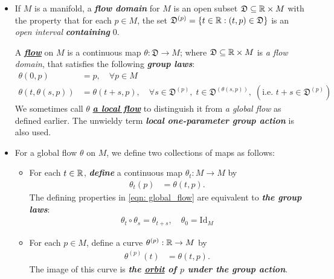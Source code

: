 \documentclass[11pt]{article}
\begin{document}
\begin{itemize}
\item \begin{definition}
If $M$ is a manifold, a \emph{\textbf{flow domain}} for $M$ is an open subset $\mathfrak{D} \subseteq {\mathbb R} \times M$ with the property that for each $p \in M$,
the set $\mathfrak{D}^{(p)} = \left\{t \in {\mathbb R}: (t, p) \in \mathfrak{D}\right\}$ is an \emph{open interval} \emph{\textbf{containing}} $0$.

A \underline{\emph{\textbf{flow}}} on $M$ is a continuous map $\theta: \mathfrak{D} \rightarrow M$; where  $\mathfrak{D} \subseteq {\mathbb R} \times M$ is \emph{a flow domain}, that satisfies the following \emph{\textbf{group laws}}: 
\begin{align}
\theta(0, p) &=p, \quad \forall p \in M  \label{eqn: local_flow_group_identity}\\
\theta(t, \theta(s, p)) &= \theta(t+s, p), \quad \forall s \in \mathfrak{D}^{(p)}, \; t \in \mathfrak{D}^{(\theta(s, p))},\; (\text{i.e. }t+s \in \mathfrak{D}^{(p)})  \label{eqn: local_flow_group}
\end{align} We sometimes call $\theta$ \underline{\emph{\textbf{a local flow}}} to distinguish it from \emph{a global flow} as defined earlier. The unwieldy term \emph{\textbf{local one-parameter group action}} is also used.
\end{definition}

\item For a global flow $\theta$ on $M$, we define two collections of maps as follows:
\begin{itemize}
\item \begin{definition}
For each $t\in {\mathbb R}$, \textbf{\emph{define}} a continuous map $\theta_t: M \rightarrow M$ by 
\begin{align*}
\theta_t(p) &= \theta(t, p). 
\end{align*} The defining properties in \eqref{eqn: global_flow} are equivalent to \emph{\textbf{the group laws}}:
\begin{align}
\theta_t \circ \theta_s = \theta_{t+s}, \quad \theta_0 = \text{Id}_{M} \label{eqn: global_flow_group}
\end{align}
\end{definition}

\item \begin{definition}
For each $p \in M$, define a curve $\theta^{(p)}: {\mathbb R} \rightarrow M$ by
\begin{align*}
\theta^{(p)}(t) &= \theta(t, p).
\end{align*} The image of this curve is \emph{\textbf{the \underline{orbit} of $p$ under the group action}}.
\end{definition}
\end{itemize}


\end{itemize}
\end{document}
